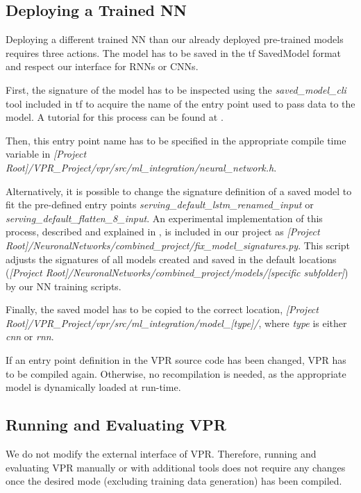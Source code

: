 \subsection{Deploying a Trained \gls{NN}}

Deploying a different trained \gls{NN} than our already deployed pre-trained models requires three actions. The model has to be saved in the \gls{tf} SavedModel format and respect our interface for \glspl{RNN} or \glspl{CNN}.

First, the signature of the model has to be inspected using the \textit{saved\_model\_cli} tool included in \gls{tf} to acquire the name of the entry point used to pass data to the model. A tutorial for this process can be found at \cite{tf-inspect-savedmodel}.

Then, this entry point name has to be specified in the appropriate compile time variable in \textit{[Project Root]/VPR\_Project/vpr/src/ml\_integration/neural\_network.h}.

Alternatively, it is possible to change the signature definition of a saved model to fit the pre-defined entry points \textit{serving\_default\_lstm\_renamed\_input} or \textit{serving\_default\_flatten\_8\_input}. An experimental implementation of this process, described and explained in \cite{rename-savedmodel}, is included in our project as \textit{[Project Root]/NeuronalNetworks/combined\_project/fix\_model\_signatures.py}. This script adjusts the signatures of all models created and saved in the default locations (\textit{[Project Root]/NeuronalNetworks/combined\_project/models/[specific subfolder]}) by our \gls{NN} training scripts.

Finally, the saved model has to be copied to the correct location, \textit{[Project Root]/VPR\_Project/vpr/src/ml\_integration/model\_[type]/}, where \textit{type} is either \textit{cnn} or \textit{rnn}.

If an entry point definition in the \gls{VPR} source code has been changed, \gls{VPR} has to be compiled again. Otherwise, no recompilation is needed, as the appropriate model is dynamically loaded at run-time.

\subsection{Running and Evaluating \gls{VPR}}

We do not modify the external interface of \gls{VPR}. Therefore, running and evaluating \gls{VPR} manually or with additional tools does not require any changes once the desired mode (excluding training data generation) has been compiled.

